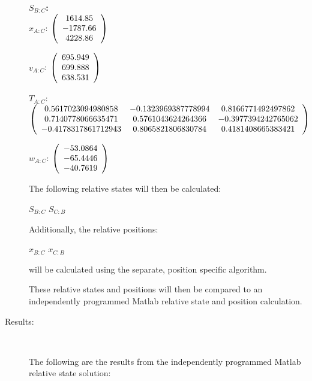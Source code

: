 \begin{description}
\Large{\textbf{$S_{B:C}$:}} \normalsize \\

$x_{A:C}$: $\left( \begin{array} {ccc} 1614.85 \\   -1787.66 \\    4228.86
\end{array} \right)\\ \\$

$v_{A:C}$:  $\left( \begin{array} {ccc} 695.949 \\    699.888 \\    638.531
\end{array} \right)\\ \\$

$T_{A:C}$: $\left( \begin{array} {ccc}
 0.5617023094980858 & -0.1323969387778994 & 0.8166771492497862 \\
  0.7140778066635471 & 0.5761043624264366 & -0.3977394242765062 \\
   -0.4178317861712943 & 0.8065821806830784 & 0.4181408665383421
\end{array} \right)\\ \\$

$w_{A:C}$:  $\left( \begin{array} {ccc}  -53.0864 \\   -65.4446 \\   -40.7619
\end{array} \right)\\ \\$

The following relative states will then be calculated:

$S_{B:C}$
$S_{C:B}$

Additionally, the relative positions:

$x_{B:C}$
$x_{C:B}$

will be calculated using the separate, position specific algorithm.

These relative states and positions will then be compared to an
independently programmed Matlab relative state and position calculation.

\item[Results:] \ \newline

The following are the results from the independently programmed Matlab relative state
solution:


\end{description}
